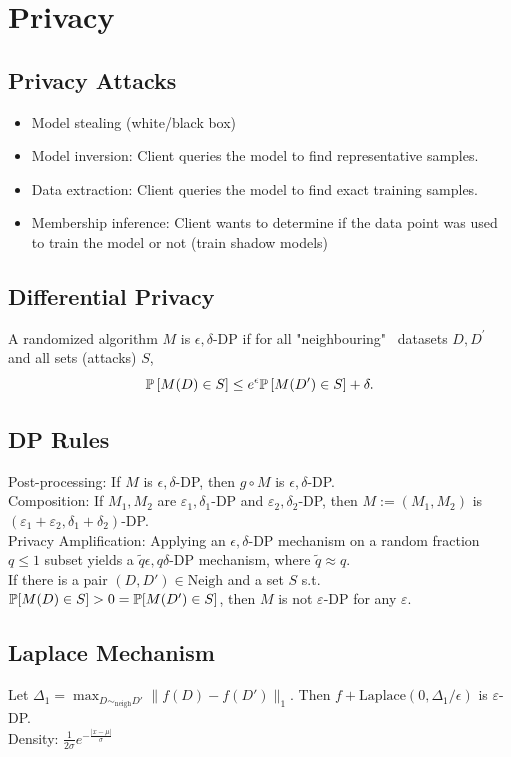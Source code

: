 \section{Privacy}
\subsection*{Privacy Attacks}
\begin{itemize}
    \item Model stealing (white/black box)
    \item Model inversion: Client queries the model to find representative samples.
    \item Data extraction: Client queries the model to find exact training samples.
    \item Membership inference: Client wants to determine if the data
          point was used to train the model or not (train shadow models)
\end{itemize}

\subsection*{Differential Privacy}
A randomized algorithm $M$ is $\epsilon, \delta$-DP if for all "neighbouring" \ datasets $D, D^\prime$ and all sets (attacks) $S$,
$$\P\left[M(D)\in S\right] \le e^\epsilon \P\left[M(D^\prime)\in S\right]+\delta.$$
\vspace*{-4mm}
\subsection*{DP Rules}
Post-processing: If $M$ is $\epsilon,\delta$-DP, then $g\circ M$ is $\epsilon,\delta$-DP.\\
Composition: If $M_1,M_2$ are $\varepsilon_1,\delta_1$-DP and $\varepsilon_2,\delta_2$-DP, then $M:=(M_1,M_2)$ is $(\varepsilon_1+\varepsilon_2,\delta_1+\delta_2)$-DP.\\
Privacy Amplification: Applying an $\epsilon,\delta$-DP mechanism on a random fraction $q\leq1$ subset yields a $\tilde{q}\epsilon,q\delta$-DP mechanism, where $\tilde{q}\approx q$.\\
If there is a pair $(D,D')\in \mathrm{Neigh}$ and a set $S$ s.t. $\P[M(D)\in S]>0=\P[M(D')\in S]$, then $M$ is not $\varepsilon$-DP for any $\varepsilon$.

\subsection*{Laplace Mechanism}
Let $\Delta_1=\max_{D\sim_{\text{neigh}}D'}\|f(D)-f(D')\|_{1}$. Then $f+\text{Laplace}(0,\Delta_1/\epsilon)$ is $\varepsilon$-DP.\\
Density: $\frac{1}{2\sigma}e^{-\frac{|x-\mu|}{\sigma}}$

